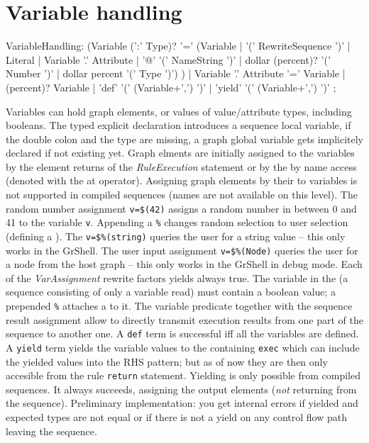 \section{Variable handling}

\begin{rail}
  VariableHandling: 
    (Variable (':' Type)? '=' 
	  (Variable | 
      '(' RewriteSequence ')' | 
      Literal | 
	  Variable '.' Attribute |
	  '@' '(' NameString ')' |
	  dollar (percent)? '(' Number ')' |
	  dollar percent '(' Type ')')
    ) |
	Variable '.' Attribute '=' Variable |
    (percent)? Variable |
    'def' '(' (Variable+',') ')' |
	'yield' '(' (Variable+',') ')' 
  ;
\end{rail}\makeatother
Variables can hold graph elements, or values of value/attribute types, including booleans.
The typed explicit declaration introduces a sequence local variable, 
if the double colon and the type are missing, a graph global variable gets implicitely declared if not existing yet.
Graph elments are initially assigned to the variables by the element returns of the \emph{RuleExecution} statement or by the by name access (denoted with the at operator).
Assigning graph elements by their  to variables is not supported in compiled sequences (names are not available on this level).
The random number assignment \texttt{v=\$(42)} assigns a random number in between 0 and 41 to the variable \texttt{v}. 
Appending a \texttt{\%} changes random selection to user selection (defining a ).
The  \texttt{v=\$\%(string)} queries the user for a string value -- this only works in the GrShell.
The user input assignment \texttt{v=\$\%(Node)} queries the user for a node from the host graph -- this only works in the GrShell in debug mode.
Each of the \emph{VarAssignment} rewrite factors yields always true.
The variable in the  (a sequence consisting of only a variable read) must contain a boolean value;
a prepended \texttt{\%} attaches a  to it.
The variable predicate together with the sequence result assignment allow to directly transmit execution results from one part of the sequence to another one.
A \texttt{def} term is successful iff all the variables are defined.
A \texttt{yield} term yields the variable values to the containing \texttt{exec} which can include the yielded values into the RHS pattern; but as of now they are then only accesible from the rule \texttt{return} statement.
Yielding is only possible from compiled sequences. 
It always succeeds, assigning the output elements (\emph{not} returning from the sequence). 
Preliminary implementation: you get internal errors if yielded and expected types are not equal or if there is not a yield on any control flow path leaving the sequence.


